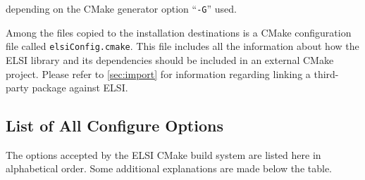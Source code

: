 \documentclass{report}
\begin{document}
depending on the CMake generator option ``\verb+-G+'' used.

Among the files copied to the installation destinations is a CMake configuration file called \texttt{elsiConfig.cmake}. This file includes all the information about how the ELSI library and its dependencies should be included in an external CMake project. Please refer to \ref{sec:import} for information regarding linking a third-party package against ELSI.

\subsection{List of All Configure Options}
\label{subsec:config_keywords}
The options accepted by the ELSI CMake build system are listed here in alphabetical order. Some additional explanations are made below the table.
\end{document}
